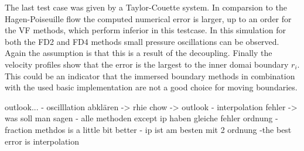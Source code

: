 The last test case was given by a Taylor-Couette system.
In comparsion to the Hagen-Poiseuille flow the  computed numerical error is larger,
up to an order for the VF methods, which perform inferior in this testcase.
In this simulation for both the FD2 and FD4 methods small pressure oscillations can be observed.
Again the assumption is that this is a result of the decoupling.
Finally the velocity profiles show that the error is the largest to the inner domai boundary $r_i$.
This could be an indicator that the immersed boundary methods in combination with the used basic implementation
are not a good choice for moving boundaries.

outlook...
- oscilllation abklären -> rhie chow -> outlook
- interpolation fehler -> was soll man sagen
- alle methoden except ip haben gleiche fehler ordnung
- fraction methdos is a little bit better
- ip ist am besten mit 2 ordnung
-the best error is interpolation



